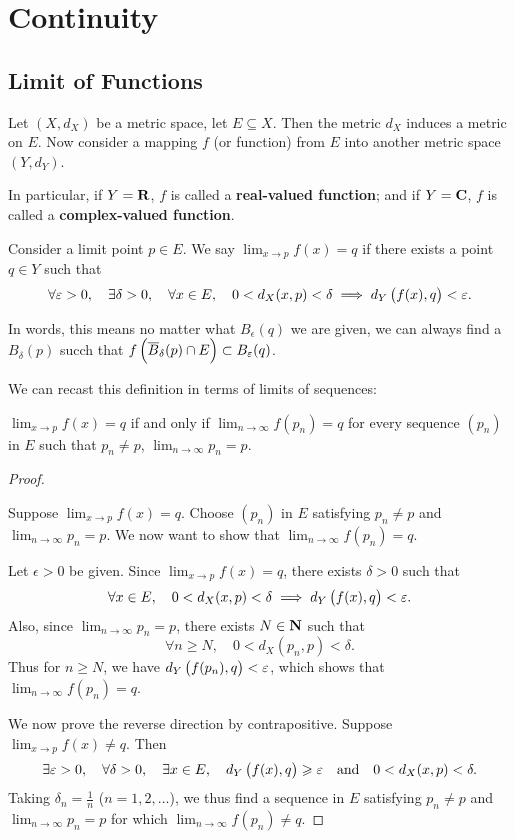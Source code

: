 \chapter{Continuity}\label{chap:real-analysis_continuity}
\section{Limit of Functions}
Let $(X,d_X)$ be a metric space, let $E\subseteq X$. Then the metric $d_X$ induces a metric on $E$. Now consider a mapping $f$ (or function) from $E$ into another metric space $(Y,d_Y)$.

In particular, if $Y=\mathbf R$, $f$ is called a \textbf{real-valued function}; and if $Y=\mathbf C$, $f$ is called a \textbf{complex-valued function}.

\begin{definition}\label{defn:limit-function}
Consider a limit point $p\in E$. We say $\displaystyle\lim_{x\to p}f(x)=q$ if there exists a point $q\in Y$ such that
\[\forall\varepsilon>0,\quad\exists\delta>0,\quad\forall x\in E,\quad0<d_X(x,p)<\delta\implies d_Y\left(f(x),q\right)<\varepsilon.\]
\end{definition}

In words, this means no matter what $B_\epsilon(q)$ we are given, we can always find a $B_\delta(p)$ succh that $f\left(\overline{B}_\delta(p)\cap E\right)\subset B_\varepsilon(q)$.

We can recast this definition in terms of limits of sequences:
\begin{theorem}\label{limit-func-seq}
$\displaystyle\lim_{x\to p}f(x)=q$ if and only if $\displaystyle\lim_{n\to\infty}f(p_n)=q$ for every sequence $(p_n)$ in $E$ such that $p_n \neq p$, $\displaystyle\lim_{n\to\infty}p_n=p$.
\end{theorem}

\begin{proof} \

\fbox{$\implies$} Suppose $\displaystyle\lim_{x\to p}f(x)=q$. Choose $(p_n)$ in $E$ satisfying $p_n \neq p$ and $\displaystyle\lim_{n\to\infty}p_n=p$. We now want to show that $\displaystyle\lim_{n\to\infty}f(p_n)=q$.

Let $\epsilon>0$ be given. Since $\displaystyle\lim_{x\to p}f(x)=q$, there exists $\delta>0$ such that 
\[\forall x\in E,\quad0<d_X(x,p)<\delta\implies d_Y\left(f(x),q\right)<\varepsilon.\]
Also, since $\displaystyle\lim_{n\to\infty}p_n=p$, there exists $N\in\mathbf N$ such that
\[\forall n\ge N,\quad 0<d_X(p_n,p)<\delta.\]
Thus for $n\ge N$, we have $d_Y\left(f(p_n),q\right)<\varepsilon$, which shows that $\displaystyle\lim_{n\to\infty}f(p_n)=q$.

\fbox{$\impliedby$} We now prove the reverse direction by contrapositive. Suppose $\displaystyle\lim_{x\to p}f(x)\neq q$. Then
\[\exists\varepsilon>0,\quad\forall\delta>0,\quad\exists x\in E,\quad d_Y\left(f(x),q\right)\geqslant\varepsilon\quad\text{and}\quad0<d_X(x,p)<\delta.\]
Taking $\delta_n=\frac{1}{n}$ ($n=1,2,\dots$), we thus find a sequence in $E$ satisfying $p_n \neq p$ and $\displaystyle\lim_{n\to\infty}p_n=p$ for which $\displaystyle\lim_{n\to\infty}f(p_n)\neq q$.
\end{proof}

